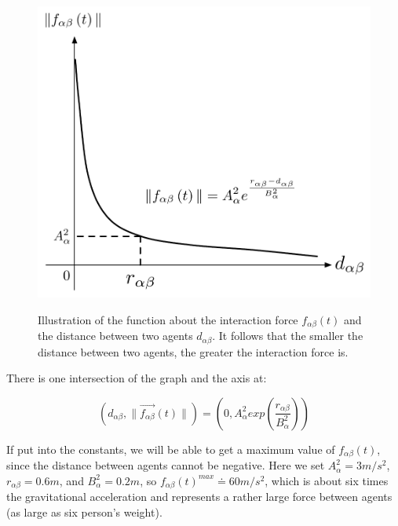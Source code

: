 \begin{figure}
    \centering
    {\includegraphics[scale=0.45]{Figures/physicalinteraction.pdf}} 
    \caption[Psysical interaction]{Illustration of the function about the interaction force 
        $f_{\alpha\beta}(t)$ and the distance between two agents
        $d_{\alpha \beta}$. It follows that the smaller the distance between two agents, the greater the interaction force is. }
    \label{fig:physicalinteraction1}
\end{figure}

There is one intersection of the graph and the  axis at:

\begin{equation}
	\left( d_{\alpha \beta} , \| \vec{f_{\alpha \beta}} \left( t \right) \| \right)
 =
	\left( 0 , A_{\alpha}^{2} exp\left( \frac{r_{\alpha\beta} }{B_{\alpha}^{2}}\right)  \right) 
\end{equation}

If put into the constants, we will be able to get a maximum value of $ f_{\alpha\beta}(t) $, 
since the distance between agents cannot be negative. Here we set $ A_{\alpha}^{2} = 3 m/s^{2} $, 
$ r_{\alpha\beta} = 0.6 m $, and $ B_{\alpha}^{2} = 0.2 m $, so 
$ f_{\alpha\beta}(t)^{max} \doteq 60 m/s^{2} $, which is about six times the gravitational 
acceleration and represents a rather large force between agents (as large as six person's weight).


